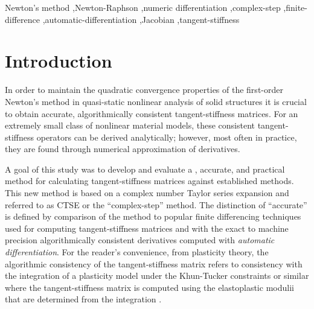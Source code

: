 \documentclass[preprint,12pt]{elsarticle}
\begin{document}
\begin{frontmatter}
\begin{abstract}
\end{abstract}

\begin{keyword}
Newton's method \sep Newton-Raphson \sep numeric differentiation \sep complex-step \sep finite-difference \sep automatic-differentiation \sep Jacobian \sep tangent-stiffness
\end{keyword}

\end{frontmatter}



\section{Introduction}
\label{sec:intro} 

In order to maintain the quadratic convergence properties of the first-order
Newton's method \cite{belytschko1999nonlinear} \cite[Ch.~13]{young2009} in
quasi-static nonlinear analysis of solid structures it is crucial to obtain
accurate, algorithmically consistent tangent-stiffness matrices. For an
extremely small class of nonlinear material models, these consistent
tangent-stiffness operators can be derived analytically; however, most often in
practice, they are found through numerical approximation of derivatives. 

A goal of this study was to develop and evaluate a 
, accurate, and practical method
for calculating tangent-stiffness matrices against established methods.  This
new method is based on a complex number Taylor series expansion and referred to
as CTSE or the ``complex-step'' method.  The distinction of ``accurate'' is
defined by comparison of the 
method to popular finite differencing techniques used for computing
tangent-stiffness matrices and with the exact to machine precision
algorithmically consistent derivatives computed with \emph{automatic
differentiation}. For the reader's convenience, from plasticity theory, the algorithmic consistency of
the tangent-stiffness matrix refers to consistency with the integration of a
plasticity model under the Khun-Tucker constraints or similar where the tangent-stiffness matrix is
computed using the elastoplastic modulii that are determined from the integration \cite{simo1998}. 
\end{document}
